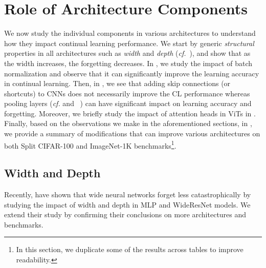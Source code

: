 \section{Role of Architecture Components}\label{sec:components}
We now study the individual components in various architectures to understand how they impact continual learning performance. We start by generic \emph{structural} properties in all architectures such as \emph{width} and \emph{depth} (\emph{cf.}~), and show that as the width increases, the forgetting decreases. In , we study the impact of batch normalization and observe that it can significantly improve the learning accuracy in continual learning. Then, in , we see that adding skip connections (or shortcuts) to CNNs does not necessarily improve the CL performance whereas pooling layers (\emph{cf.}  and ~) can have significant impact on learning accuracy and forgetting. Moreover, we briefly study the impact of attention heads in ViTs in . Finally, based on the observations we make in the aforementioned sections, in , we provide a summary of modifications that can improve various architectures on both Split CIFAR-100 and ImageNet-1K benchmarks\footnote{In this section, we duplicate some of the results across tables to improve readability.}.


\subsection{Width and Depth}
\label{sec:analysis-width-depth}
Recently, \citet{Mirzadeh2021WideNN} have shown that wide neural networks forget less catastrophically by studying the impact of width and depth in MLP and WideResNet models. We extend their study by confirming their conclusions on more architectures and benchmarks.

